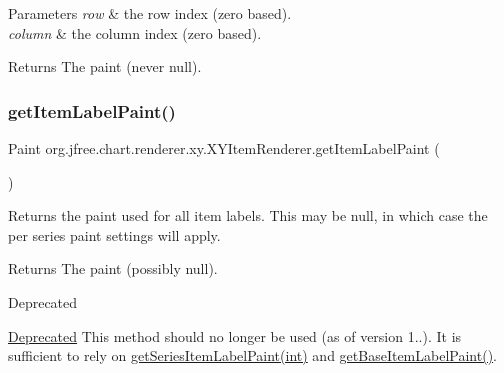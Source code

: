 \begin{DoxyParams}{Parameters}
{\em row} & the row index (zero based). \\
\hline
{\em column} & the column index (zero based).\\
\hline
\end{DoxyParams}
\begin{DoxyReturn}{Returns}
The paint (never {\ttfamily null}). 
\end{DoxyReturn}
\mbox{\label{interfaceorg_1_1jfree_1_1chart_1_1renderer_1_1xy_1_1_x_y_item_renderer_a39e6806273257e0c6a3169f9ba6eb131}} 
\subsubsection{\texorpdfstring{get\+Item\+Label\+Paint()}{getItemLabelPaint()}\hspace{0.1cm}{\footnotesize\ttfamily [2/2]}}
{\footnotesize\ttfamily Paint org.\+jfree.\+chart.\+renderer.\+xy.\+X\+Y\+Item\+Renderer.\+get\+Item\+Label\+Paint (\begin{DoxyParamCaption}{ }\end{DoxyParamCaption})}

Returns the paint used for all item labels. This may be {\ttfamily null}, in which case the per series paint settings will apply.

\begin{DoxyReturn}{Returns}
The paint (possibly {\ttfamily null}).
\end{DoxyReturn}
\begin{DoxyRefDesc}{Deprecated}
\item[\mbox{\hyperlink{deprecated__deprecated000231}{Deprecated}}]This method should no longer be used (as of version 1..). It is sufficient to rely on \mbox{\hyperlink{interfaceorg_1_1jfree_1_1chart_1_1renderer_1_1xy_1_1_x_y_item_renderer_a4de36c3b8a459d72af75f20f253be2cd}{get\+Series\+Item\+Label\+Paint(int)}} and \mbox{\hyperlink{interfaceorg_1_1jfree_1_1chart_1_1renderer_1_1xy_1_1_x_y_item_renderer_ab42b215e825414ef3c0d345b3ae39bce}{get\+Base\+Item\+Label\+Paint()}}. \end{DoxyRefDesc}
\mbox{\label{interfaceorg_1_1jfree_1_1chart_1_1renderer_1_1xy_1_1_x_y_item_renderer_a2050da09caa68a91809cb20a53edf3c6}} 

